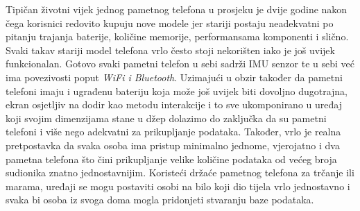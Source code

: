 \documentclass[times, utf8, diplomski]{fer}
\begin{document}
Tipičan životni vijek jednog pametnog telefona u prosjeku je dvije godine nakon čega korisnici redovito kupuju nove modele jer stariji postaju neadekvatni
po pitanju trajanja baterije, količine memorije, performansama komponenti i slično. Svaki takav stariji model telefona vrlo često stoji nekorišten iako je još uvijek
funkcionalan. Gotovo svaki pametni telefon u sebi sadrži IMU senzor te u sebi već ima povezivosti poput \textit{WiFi i Bluetooth}. Uzimajući u obzir
također da pametni telefoni imaju i ugrađenu bateriju koja može još uvijek biti dovoljno dugotrajna, ekran osjetljiv na dodir kao metodu interakcije i to 
sve ukomponirano u uređaj koji svojim dimenzijama stane u džep dolazimo do zaključka da su pametni telefoni i više nego adekvatni za prikupljanje podataka.
Također, vrlo je realna pretpostavka da svaka osoba ima pristup minimalno jednome, vjerojatno i dva pametna telefona što čini prikupljanje velike količine
podataka od većeg broja sudionika znatno jednostavnijim. Koristeći držaće pametnog telefona za trčanje ili marama, uređaji se mogu postaviti osobi na bilo koji
dio tijela vrlo jednostavno i svaka bi osoba iz svoga doma mogla pridonjeti stvaranju baze podataka.
\end{document}
